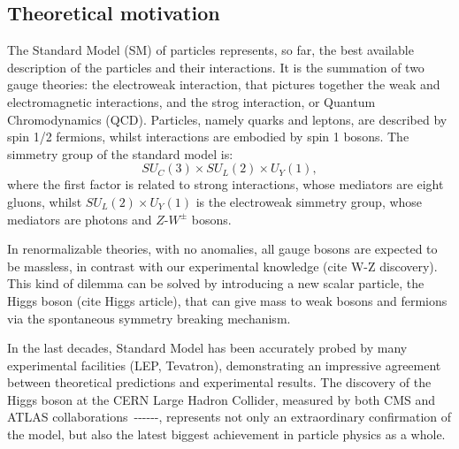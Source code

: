 \begin{tcolorbox}[breakable,colback=black!5!white,colframe=red!80!black,width=\textwidth]
\chapter{Theoretical motivation}
\end{tcolorbox}
\label{sec:theory}

The Standard Model (SM) of particles represents, so far, the best available description of the particles and their interactions. It is the summation of two gauge theories: the electroweak interaction, that pictures together the weak and electromagnetic interactions, and the strog interaction, or Quantum Chromodynamics (QCD). Particles, namely quarks and leptons, are described by spin 1/2 fermions, whilst interactions are embodied by spin 1 bosons. The simmetry group of the standard model is:
\begin{equation}
SU_{C}(3) \times SU_L (2) \times U_Y (1),
\end{equation}
\label{eq:theory_SMgroup}
where the first factor is related to strong interactions, whose mediators are eight gluons, whilst $SU_L (2) \times U_Y (1)$ is the electroweak simmetry group, whose mediators are photons and $Z$-$W^{\pm}$ bosons.

In renormalizable theories, with no anomalies, all gauge bosons are expected to be massless, in contrast with our experimental knowledge (cite W-Z discovery). This kind of dilemma can be solved by introducing a new scalar particle, the Higgs boson (cite Higgs article), that can give mass to weak bosons and fermions via the spontaneous symmetry breaking mechanism.

In the last decades, Standard Model has been accurately probed by many experimental facilities (LEP, Tevatron), demonstrating an impressive agreement between theoretical predictions and experimental results. The discovery of the Higgs boson at the CERN Large Hadron Collider, measured by both CMS and ATLAS collaborations~\cite{bib:Aad20121}-\cite{bib:Chatrchyan201230}-\cite{bib:Chatrchyan2013lba}-\cite{Aad:2013xqa}-\cite{Khachatryan:2014jba}-\cite{Aad:2014aba}-\cite{Aad:2015zhl}, represents not only an extraordinary confirmation of the model, but also the latest biggest achievement in particle physics as a whole.

